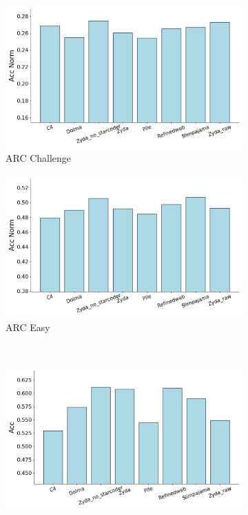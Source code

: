 \documentclass{article}
\begin{document}
\begin{figure}[!htb] %
    \centering
    \begin{subfigure}{0.45\textwidth}
        \includegraphics[width=\textwidth]{figures/ablations_per_eval/ablations_evals_Arc_Challenge.png}
        \caption{ARC Challenge}
    \end{subfigure}
    \hfill
    \begin{subfigure}{0.45\textwidth}
        \includegraphics[width=\textwidth]{figures/ablations_per_eval/ablations_evals_Arc_Easy.png}
        \caption{ARC Easy}
    \end{subfigure}
    \\
    \begin{subfigure}{0.45\textwidth}
        \includegraphics[width=\textwidth]{figures/ablations_per_eval/ablations_evals_Boolq.png}

\end{subfigure}
\end{figure}
\end{document}
